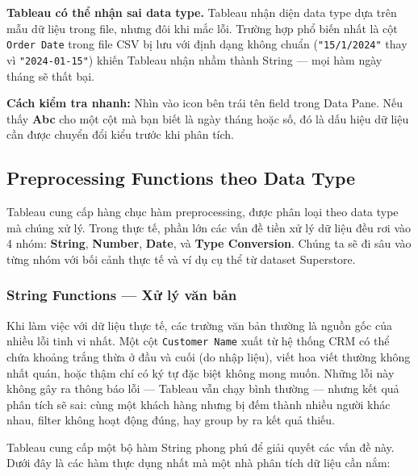 \documentclass[12pt]{article}
\begin{document}
\begin{notebox}
\textbf{Tableau có thể nhận sai data type.} Tableau nhận diện data type dựa trên mẫu dữ liệu trong file, nhưng đôi khi mắc lỗi. Trường hợp phổ biến nhất là cột \texttt{Order Date} trong file CSV bị lưu với định dạng không chuẩn (\texttt{"15/1/2024"} thay vì \texttt{"2024-01-15"}) khiến Tableau nhận nhầm thành String --- mọi hàm ngày tháng sẽ thất bại.

\noindent \textbf{Cách kiểm tra nhanh:} Nhìn vào icon bên trái tên field trong Data Pane. Nếu thấy \textbf{Abc} cho một cột mà bạn biết là ngày tháng hoặc số, đó là dấu hiệu dữ liệu cần được chuyển đổi kiểu trước khi phân tích.
\end{notebox}

\subsection{Preprocessing Functions theo Data Type}

\noindent Tableau cung cấp hàng chục hàm preprocessing, được phân loại theo data type mà chúng xử lý. Trong thực tế, phần lớn các vấn đề tiền xử lý dữ liệu đều rơi vào 4 nhóm: \textbf{String}, \textbf{Number}, \textbf{Date}, và \textbf{Type Conversion}. Chúng ta sẽ đi sâu vào từng nhóm với bối cảnh thực tế và ví dụ cụ thể từ dataset Superstore.

\subsubsection{String Functions --- Xử lý văn bản}

\noindent Khi làm việc với dữ liệu thực tế, các trường văn bản thường là nguồn gốc của nhiều lỗi tinh vi nhất. Một cột \texttt{Customer Name} xuất từ hệ thống CRM có thể chứa khoảng trắng thừa ở đầu và cuối (do nhập liệu), viết hoa viết thường không nhất quán, hoặc thậm chí có ký tự đặc biệt không mong muốn. Những lỗi này không gây ra thông báo lỗi --- Tableau vẫn chạy bình thường --- nhưng kết quả phân tích sẽ sai: cùng một khách hàng nhưng bị đếm thành nhiều người khác nhau, filter không hoạt động đúng, hay group by ra kết quả thiếu.

\noindent Tableau cung cấp một bộ hàm String phong phú để giải quyết các vấn đề này. Dưới đây là các hàm thực dụng nhất mà một nhà phân tích dữ liệu cần nắm:
\end{document}
